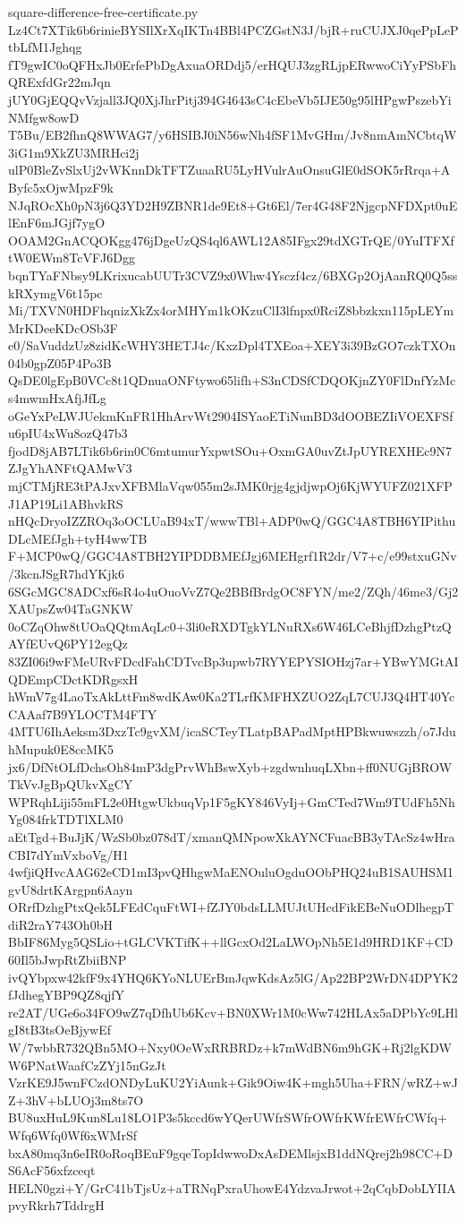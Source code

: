 \documentclass[11pt]{article}
\theoremstyle{definition}
\theoremstyle{remark}
\begin{document}
\begin{filecontents*}[overwrite]{square-difference-free-certificate.py}
Lz4Ct7XTik6b6rinieBYSIlXrXqIKTn4BBl4PCZGstN3J/bjR+ruCUJXJ0qePpLePtbLfM1Jghqg
fT9gwIC0oQFHxJb0ErfePbDgAxuaORDdj5/erHQUJ3zgRLjpERwwoCiYyPSbFhQRExfdGr22mJqn
jUY0GjEQQvVzjall3JQ0XjJhrPitj394G4643sC4cEbeVb5IJE50g95lHPgwPszebYiNMfgw8owD
T5Bu/EB2fhnQ8WWAG7/y6HSIBJ0iN56wNh4fSF1MvGHm/Jv8nmAmNCbtqW3iG1m9XkZU3MRHci2j
ulP0BleZvSlxUj2vWKnnDkTFTZuaaRU5LyHVulrAuOnsuGlE0dSOK5rRrqa+AByfc5xOjwMpzF9k
NJqROcXh0pN3j6Q3YD2H9ZBNR1de9Et8+Gt6El/7er4G48F2NjgcpNFDXpt0uElEnF6mJGjf7ygO
OOAM2GnACQOKgg476jDgeUzQS4ql6AWL12A85IFgx29tdXGTrQE/0YuITFXftW0EWm8TcVFJ6Dgg
bqnTYaFNbsy9LKrixucabUUTr3CVZ9x0Whw4Ysczf4cz/6BXGp2OjAanRQ0Q5sskRXymgV6t15pc
Mi/TXVN0HDFhqnizXkZx4orMHYm1kOKzuClI3lfnpx0RciZ8bbzkxn115pLEYmMrKDeeKDcOSb3F
e0/SaVuddzUz8zidKcWHY3HETJ4c/KxzDpl4TXEoa+XEY3i39BzGO7czkTXOn04b0gpZ05P4Po3B
QsDE0lgEpB0VCc8t1QDnuaONFtywo65lifh+S3nCDSfCDQOKjnZY0FlDnfYzMcs4mwmHxAfjJfLg
oGeYxPeLWJUekmKnFR1HhArvWt2904ISYaoETiNunBD3dOOBEZIiVOEXFSfu6pIU4xWu8ozQ47b3
fjodD8jAB7LTik6b6rin0C6mtumurYxpwtSOu+OxmGA0uvZtJpUYREXHEc9N7ZJgYhANFtQAMwV3
mjCTMjRE3tPAJxvXFBMlaVqw055m2sJMK0rjg4gjdjwpOj6KjWYUFZ021XFPJ1AP19Li1ABhvkRS
nHQcDryoIZZROq3oOCLUaB94xT/wwwTBl+ADP0wQ/GGC4A8TBH6YIPithuDLcMEfJgh+tyH4wwTB
F+MCP0wQ/GGC4A8TBH2YIPDDBMEfJgj6MEHgrf1R2dr/V7+c/e99stxuGNv/3kcnJSgR7hdYKjk6
6SGcMGC8ADCxf6sR4o4uOuoVvZ7Qe2BBfBrdgOC8FYN/me2/ZQh/46me3/Gj2XAUpsZw04TaGNKW
0oCZqOhw8tUOaQQtmAqLc0+3li0eRXDTgkYLNuRXs6W46LCeBhjfDzhgPtzQAYfEUvQ6PY12egQz
83ZI06i9wFMeURvFDcdFahCDTvcBp3upwb7RYYEPYSIOHzj7ar+YBwYMGtAIQDEmpCDctKDRgsxH
hWmV7g4LaoTxAkLttFm8wdKAw0Ka2TLrfKMFHXZUO2ZqL7CUJ3Q4HT40YcCAAaf7B9YLOCTM4FTY
4MTU6IhAeksm3DxzTc9gvXM/icaSCTeyTLatpBAPadMptHPBkwuwszzh/o7JduhMupuk0E8ccMK5
jx6/DfNtOLfDchsOh84mP3dgPrvWhBswXyb+zgdwnhuqLXbn+ff0NUGjBROWTkVvJgBpQUkvXgCY
WPRqhLiji55mFL2e0HtgwUkbuqVp1F5gKY846VyIj+GmCTed7Wm9TUdFh5NhYg084frkTDTlXLM0
aEtTgd+BuJjK/WzSb0bz078dT/xmanQMNpowXkAYNCFuacBB3yTAcSz4wHraCBI7dYmVxboVg/H1
4wfjiQHvcAAG62eCD1mI3pvQHhgwMaENOuluOgduOObPHQ24uB1SAUHSM1gvU8drtKArgpn6Aayn
ORrfDzhgPtxQek5LFEdCquFtWI+fZJY0bdsLLMUJtUHcdFikEBeNuODlhegpTdiR2raY743Oh0bH
BbIF86Myg5QSLio+tGLCVKTifK++llGcxOd2LaLWOpNh5E1d9HRD1KF+CD60Il5bJwpRtZbiiBNP
ivQYbpxw42kfF9x4YHQ6KYoNLUErBmJqwKdsAz5lG/Ap22BP2WrDN4DPYK2fJdhegYBP9QZ8qjfY
re2AT/UGe6o34FO9wZ7qDfhUb6Kcv+BN0XWr1M0cWw742HLAx5aDPbYc9LHlgI8tB3tsOeBjywEf
W/7wbbR732QBn5MO+Nxy0OeWxRRBRDz+k7mWdBN6m9hGK+Rj2lgKDWW6PNatWaafCzZYj15nGzJt
VzrKE9J5wnFCzdONDyLuKU2YiAunk+Gik9Oiw4K+mgh5Uha+FRN/wRZ+wJZ+3hV+bLUOj3m8ts7O
BU8uxHuL9Kun8Lu18LO1P3s5kccd6wYQerUWfrSWfrOWfrKWfrEWfrCWfq+Wfq6Wfq0Wf6xWMrSf
bxA80mq3n6eIR0oRoqBEuF9gqeTopIdwwoDxAsDEMlsjxB1ddNQrej2h98CC+DS6AcF56xfzceqt
HELN0gzi+Y/GrC41bTjsUz+aTRNqPxraUhowE4YdzvaJrwot+2qCqbDobLYIIApvyRkrh7TddrgH

\end{filecontents*}
\end{document}
